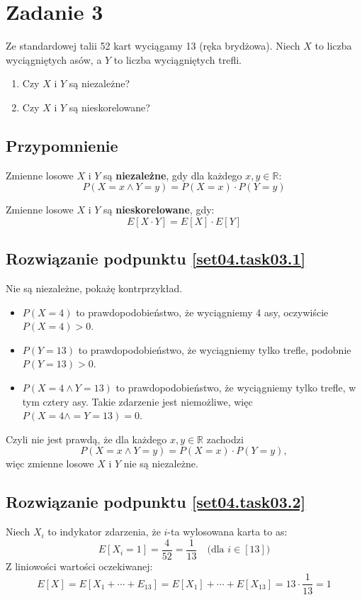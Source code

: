 \section{Zadanie 3}
Ze standardowej talii 52 kart wyciągamy 13 (ręka brydżowa). Niech \(X\) to
liczba wyciągniętych asów, a \(Y\) to liczba wyciągniętych trefli.

\begin{enumerate}[label=(\roman*)]
	\item\label{set04.task03.1} Czy \(X\) i \(Y\) są niezależne?
	\item\label{set04.task03.2} Czy \(X\) i \(Y\) są nieskorelowane?
\end{enumerate}

\subsection*{Przypomnienie}
Zmienne losowe \(X\) i \(Y\) są \textbf{niezależne}, gdy dla każdego
\(x, y \in \mathbb{R}\):
\[
	P(X=x \land Y=y) = P(X=x) \cdot P(Y=y)
\]

Zmienne losowe \(X\) i \(Y\) są \textbf{nieskorelowane}, gdy:
\[
	E[X \cdot Y] = E[X] \cdot E[Y]
\]

\subsection*{Rozwiązanie podpunktu \ref{set04.task03.1}}
Nie są niezależne, pokażę kontrprzykład.

\begin{itemize}
	\item \(P(X=4)\) to prawdopodobieństwo, że wyciągniemy 4 asy, oczywiście
	      \(P(X=4) > 0\).

	\item \(P(Y=13)\) to prawdopodobieństwo, że wyciągniemy tylko trefle, podobnie
	      \(P(Y=13) > 0\).

	\item \(P(X=4 \land Y=13)\) to prawdopodobieństwo, że wyciągniemy tylko trefle,
	      w tym cztery asy. Takie zdarzenie jest niemożliwe, więc
	      \(P(X=4 \land = Y=13) = 0\).
\end{itemize}
Czyli nie jest prawdą, że dla każdego \(x, y \in \mathbb{R}\) zachodzi
\[P(X=x \land Y=y) = P(X=x) \cdot P(Y=y),\]
więc zmienne losowe \(X\) i \(Y\) nie są niezależne.

\subsection*{Rozwiązanie podpunktu \ref{set04.task03.2}}
Niech \(X_i\) to indykator zdarzenia, że \(i\)-ta wylosowana karta to as:
\[
	E[X_i=1] = \frac{4}{52} = \frac{1}{13} \quad\text{(dla \(i \in [13]\))}
\]
Z liniowości wartości oczekiwanej:
\[
	E[X]
	= E[X_1 + \cdots + E_{13}]
	= E[X_1] + \cdots + E[X_{13}]
	= 13 \cdot \frac{1}{13} = 1
\]


